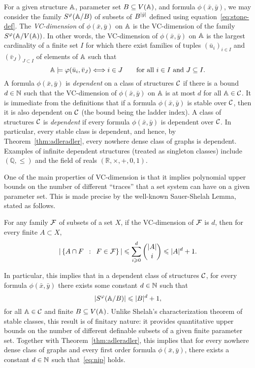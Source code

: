 For a given structure $\str A$, parameter set $B\subseteq V(\str A)$, and formula $\phi(\bar x,\bar y)$,
we may consider the family $S^\phi(\str A/B)$ of subsets of $B^{|\tup y|}$ defined using equation~\eqref{eq:stone-def}.
The \emph{VC-dimension} of $\phi(\bar x,\bar y)$ on $\str A$ is the VC-dimension of the family $S^\phi(\str A/V(\str A))$. 
In other words, the VC-dimension of $\phi(\bar x,\bar y)$
on $\str A$ is the largest cardinality of a finite
set $I$ for which there exist families of tuples $(\bar u_i)_{i\in I}$ and $(\bar v_J)_{J\subset I}$
of elements of $\str A$
such that  $$\strA\models\phi(\tup{u}_i,\tup{v}_J)\Longleftrightarrow i\in J\qquad \text {for all $i\in I$ and $J\subset I$.}$$
A formula $\phi(\bar x,\bar y)$ is \emph{dependent} on a class of structures $\cal C$
if there is a bound $d\in\N$ such that the VC-dimension of $\phi(\bar x,\bar y)$ on $\str A$ is at most $d$ for all $\str A\in\cal C$.
It is immediate from the definitions  that if a formula $\phi(\bar x,\bar y)$ is stable over $\cal C$, then it is also dependent on $\cal C$ (the bound being the ladder index). 
A class of structures  $\cal C$ is {\em{dependent}} if every formula $\phi(\bar x,\bar y)$ is dependent over $\cal C$. 
In particular, every stable class is dependent, and hence, by Theorem~\ref{thm:adleradler}, every nowhere dense class of graphs is dependent.
Examples of infinite dependent structures (treated as singleton classes) include 
$(\mathbb Q,\le )$ and the field of reals $(\mathbb R,\times,+,0,1)$. 

One of the main properties of VC-dimension is that it implies polynomial upper bounds on the number of different ``traces'' that a set system can have on a given parameter set.
This is made precise by the well-known Sauer-Shelah Lemma, stated as follows.
\begin{theorem}\label{thm:sauer-shelah}
  For any family $\FFF$ of subsets of a set $X$, if the VC-dimension of $\FFF$ is $d$,
  then for every finite $A\subset X$,
\[|\setof{A\cap F}{F\in {\cal F}}|\le \sum_{i\geq 0}^d \binom{|A|}{i}\leq |A|^d+1.\] 
\end{theorem}
In particular, this implies that 
in a dependent class of structures $\cal C$, 
for every formula $\phi(\bar x,\bar y)$
there exists some constant $d\in \N$
such that
\begin{equation}\label{eq:nip}
|S^\phi(\str A/B)|\le |B|^d+1,	
\end{equation}
for all $\str A\in\cal C$ and finite $B\subset V(\str A)$.
Unlike Shelah's characterization theorem of stable classes, this result 
is of finitary nature: it provides quantitative upper bounds on the number of different definable subsets of a given finite parameter set. 
Together with Theorem~\ref{thm:adleradler}, this implies that for every nowhere dense class of graphs %
and every first order formula $\phi(\bar x,\bar y)$,
there exists a constant \mbox{$d\in\N$} such that~\eqref{eq:nip} holds. 

